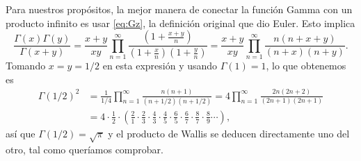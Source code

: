 \documentclass[autocontact]{gaceta}
\begin{document}
Para nuestros propósitos, la mejor manera de conectar la función Gamma con un producto infinito es usar \eqref{eq:Gz}, la definición original que dio Euler. Esto implica
\[
\frac{\Gamma(x)\Gamma(y)}{\Gamma(x+y)}
 = \frac{x+y}{xy} \prod_{n=1}^{\infty}
 \frac{\left(1+\frac{x+y}{n}\right)}{\left(1+\frac{x}{n}\right)\left(1+\frac{y}{n}\right)}
 = \frac{x+y}{xy} \prod_{n=1}^{\infty}
 \frac{n(n+x+y)}{(n+x)(n+y)}.
\]
Tomando $x=y=1/2$ en esta expresión y usando $\Gamma(1)=1$, lo que obtenemos es
\begin{align*}
  \Gamma(1/2)^2
  &= \frac{1}{1/4} \prod_{n=1}^{\infty} \frac{n(n+1)}{(n+1/2)(n+1/2)}
  = 4 \prod_{n=1}^{\infty} \frac{2n(2n+2)}{(2n+1)(2n+1)} \\
  &= 4 \cdot \frac{1}{2} \cdot \left( \frac{2}{1} \cdot \frac{2}{3} \cdot \frac{4}{3} \cdot \frac{4}{5}
  \cdot \frac{6}{5} \cdot \frac{6}{7} \cdot \frac{8}{7} \cdot \frac{8}{9}  \cdots\right),
\end{align*}
así que $\Gamma(1/2) = \sqrt{\pi}$ y el producto de Wallis se deducen directamente uno del otro, tal como queríamos comprobar.

\bigskip


\end{document}
